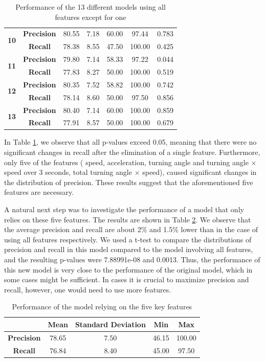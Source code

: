 \documentclass{article}
\begin{document}
\begin{table}[h]
\begin{tabular}{|c|c|c|c|c|c|c|}
\multirow{2}{*}{{\bf 10}} & {\bf Precision} & 80.55& 7.18& 60.00& 97.44&0.783\\  
& {\bf Recall} &78.38 & 8.55 &47.50 &100.00 & 0.425\\ \hline

\multirow{2}{*}{{\bf 11}} & {\bf Precision} & 79.80 & 7.14 &58.33 &97.22 & 0.044\\  
& {\bf Recall} & 77.83& 8.27&50.00 &100.00& 0.519\\ \hline

\multirow{2}{*}{{\bf 12}} & {\bf Precision} & 80.35& 7.52& 58.82& 100.00& 0.742\\  
& {\bf Recall} & 78.14 & 8.60 & 50.00& 97.50& 0.856\\ \hline

\multirow{2}{*}{{\bf 13}} & {\bf Precision} & 80.40& 7.14& 60.00& 100.00& 0.859\\  
& {\bf Recall} &77.91 &8.57 &50.00 &100.00&0.679\\ \hline
\end{tabular}
\caption{Performance of the 13 different models using all features except for one}
\label{tab:many}
\end{table}


In Table \ref{tab:many}, we observe that all p-values exceed 0.05, meaning that there were no significant changes in recall after the elimination of a single feature. Furthermore, only five of the features ( speed, acceleration, turning angle and turning angle $\times$ speed over 3 seconds, total turning angle $\times$ speed), caused significant changes in the distribution of precision. These results suggest that the aforementioned five features are necessary. 

A natural next step was to investigate the performance of a model that only relies on these five features. The results are shown in Table \ref{tab:red}. We observe that the average precision and recall are about 2\% and 1.5\% lower than in the case of using all features respectively. We used a t-test to compare the distributions of precision and recall in this model compared to the model involving all features, and the resulting p-values were 7.88991e-08 and 0.0013. Thus, the performance of this new model is very close to the performance of the original model, which in some cases might be sufficient. In cases it is crucial to maximize precision and recall, however, one would need to use more features. 


\begin{table}[h]
\centering
\begin{tabular}{|c|c|c|c|c|} \hline
& {\bf Mean} & {\bf Standard Deviation} & {\bf Min} & {\bf Max} \\ \hline
{\bf Precision} &78.65 &7.50 &46.15 & 100.00 \\ \hline 
{\bf Recall} &76.84 & 8.40& 45.00& 97.50\\ \hline
\end{tabular}
\caption{Performance of the model relying on the five key features}
\label{tab:red}
\end{table}
\end{document}
